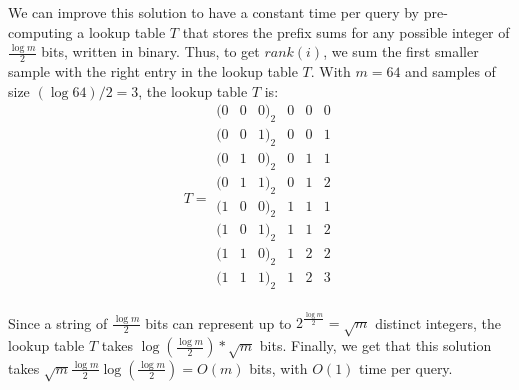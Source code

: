 \documentclass{article}
\begin{document}
We can improve this solution to have a constant time per query by pre-computing a lookup table $T$ that stores the prefix sums for any possible integer of $\frac{\log m}{2}$ bits, written in binary. Thus, to get $rank(i)$, we sum the first smaller sample with the right entry in the lookup table $T$. With $m=64$ and samples of size $(\log 64)/2 = 3$, the lookup table $T$ is:
\[
    T=
    \begin{array}{ccc|ccc}
        (0 & 0 & 0)_2 & 0 & 0 & 0\\
        (0 & 0 & 1)_2 & 0 & 0 & 1\\
        (0 & 1 & 0)_2 & 0 & 1 & 1\\
        (0 & 1 & 1)_2 & 0 & 1 & 2\\
        (1 & 0 & 0)_2 & 1 & 1 & 1\\
        (1 & 0 & 1)_2 & 1 & 1 & 2\\
        (1 & 1 & 0)_2 & 1 & 2 & 2\\
        (1 & 1 & 1)_2 & 1 & 2 & 3\\
    \end{array}
\]

Since a string of $\frac{\log m}{2}$ bits can represent up to $2^{\frac{\log m}{2}}=\sqrt m$ distinct integers, the lookup table $T$ takes $\log(\frac{\log m}{2})*\sqrt m$ bits. Finally, we get that this solution takes $\sqrt{m}\frac{\log m}{2}\log(\frac{\log m}{2})=O(m)$ bits, with $O(1)$ time per query.
\end{document}
